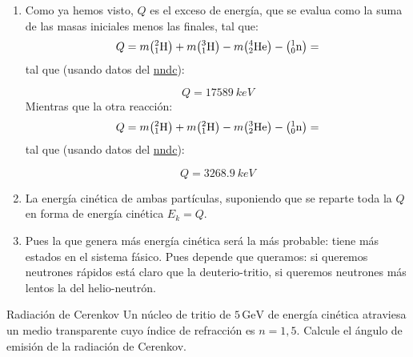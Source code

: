 \begin{enumerate}[label=\alph*)]
    \item Como ya hemos visto, $Q$ es el exceso de energía, que se evalua como la suma de las masas iniciales menos las finales, tal que:
    \begin{equation}
        Q =m\pqty{^{2}_{1}\text{H}}+ m \pqty{^{3}_{1}\text{H}} -  m\pqty{^{4}_{2}\text{He}} - \pqty{^{1}_{0}\text{n}} = 
    \end{equation}
    tal que (usando datos del \href{https://www.nndc.bnl.gov/nudat3/}{nndc}):

    \begin{equation}
        Q = 17589  \ \unit{keV}
    \end{equation}
    Mientras que la otra reacción: 
    \begin{equation}
        Q =m\pqty{^{2}_{1}\text{H}}+ m \pqty{^{2}_{1}\text{H}} -  m\pqty{^{3}_{2}\text{He}} - \pqty{^{1}_{0}\text{n}} = 
    \end{equation}
    tal que (usando datos del \href{https://www.nndc.bnl.gov/nudat3/}{nndc}):

    \begin{equation}
        Q = 3268.9 \ \unit{keV}
    \end{equation}
    \item La energía cinética de ambas partículas, suponiendo que se reparte toda la $Q$ en forma de energía cinética $E_k=Q$.
    \item Pues la que genera más energía cinética será la más probable: tiene más estados en el sistema fásico. Pues depende que queramos: si queremos neutrones rápidos está claro que la deuterio-tritio, si queremos neutrones más lentos la del helio-neutrón. 
\end{enumerate}


\begin{Ejercicio}{Radiación de Cerenkov}\label{Ej:10}
Un núcleo de tritio de $5\,\mathrm{GeV}$ de energía cinética atraviesa un medio transparente cuyo índice de refracción es $n=1{,}5$.  
Calcule el ángulo de emisión de la radiación de Cerenkov.
\end{Ejercicio}

